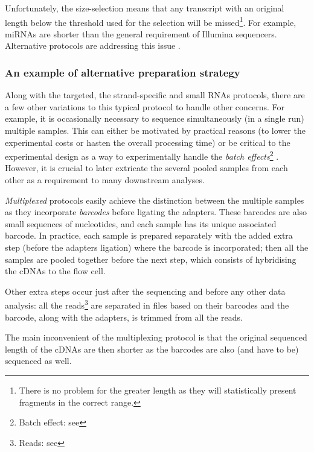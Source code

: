 Unfortunately, the size-selection means that any
transcript with an original length below the threshold used for the
selection will be missed\footnote{There is no problem for the greater length
as they will statistically present fragments in the correct range.}.
For example, \glspl{miRNA} are shorter than the general requirement of Illumina
sequencers. Alternative protocols are addressing this issue
.\mybr\

\subsubsection{An example of alternative preparation strategy}
Along with the targeted, the strand-specific and small \glspl{RNA} protocols,
there are a few other variations to this typical protocol to handle other concerns.
For example, it is occasionally necessary to sequence simultaneously (in a single
run) multiple samples. This can either be motivated by practical reasons
(to lower the experimental costs or hasten the overall processing time)
 or be critical to the experimental design as a way to
experimentally handle the \emph{batch effects}\footnote{Batch effect: see
} . However, it is
crucial to later extricate the several pooled samples from each other as a
requirement to many downstream analyses.\mybr\

\emph{Multiplexed} protocols easily achieve
the distinction between the multiple samples as they incorporate \emph{barcodes}
before ligating the adapters. These barcodes are also small sequences of
nucleotides, and each sample has its unique associated
barcode. In practice, each sample is prepared separately with the added extra
step (before the adapters ligation) where the barcode is incorporated; then all
the samples are pooled together before the next step, which consists of hybridising
the \glspl{cDNA} to the flow cell.\mybr\

Other extra steps occur just after the sequencing and before any other data
analysis: all the reads\footnote{Reads: see } are
separated in files based on their barcodes and the barcode, along with the
adapters, is trimmed from all the reads.\mybr\

The main inconvenient of the multiplexing protocol is that the original sequenced
length of the \glspl{cDNA} are then shorter as the barcodes are also (and have
to be) sequenced as well.\mybr\

